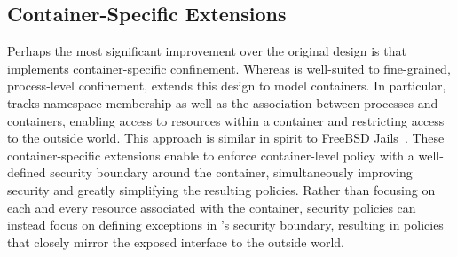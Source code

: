 \subsection{Container-Specific Extensions}%
\label{ss:bpfcontain-extending}

Perhaps the most significant improvement over the original \bpfbox{} design is that
\bpfcontain{} implements container-specific confinement. Whereas \bpfbox{} is well-suited
to fine-grained, process-level confinement, \bpfcontain{} extends this design to model
containers. In particular, \bpfcontain{} tracks namespace membership as well as the
association between processes and containers, enabling access to resources within
a container and restricting access to the outside world. This approach is similar in
spirit to FreeBSD Jails~\cite{kamp2000_jails}. These container-specific extensions enable
\bpfcontain{} to enforce container-level policy with a well-defined security boundary
around the container, simultaneously improving security and greatly simplifying the
resulting policies. Rather than focusing on each and every resource associated with the
container, security policies can instead focus on defining exceptions in \bpfcontain{}'s
security boundary, resulting in policies that closely mirror the exposed interface to the
outside world.




